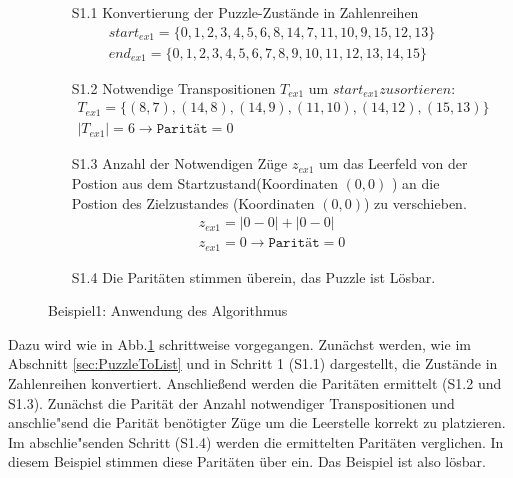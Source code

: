 \begin{figure}[H]
	\begin{enumerate}
		\item[S1.1] Konvertierung der Puzzle-Zustände in Zahlenreihen
		\begin{align*}
		start_{ex1} = \{0,1,2,3,4,5,6,8,14,7,11,10,9,15,12,13\} \\
		end_{ex1} = \{0,1,2,3,4,5,6,7,8,9,10,11,12,13,14,15\}
		\end{align*}
		\item[S1.2] Notwendige Transpositionen $T_{ex1}$ um $start_{ex1} zu sortieren:$
		\begin{align*}		
		T_{ex1} = \{(8,7),(14,8),(14,9),(11,10),(14,12),(15,13)\}\\
		\left\vert T_{ex1}\right\vert = 6 \rightarrow \texttt{Parität} = 0	
		\end{align*}
		\item[S1.3] Anzahl der Notwendigen Züge $z_{ex1}$ um das Leerfeld von der Postion aus dem Startzustand(Koordinaten $(0,0)$ ) an die Postion des Zielzustandes (Koordinaten $(0,0)$) zu verschieben.
		\begin{align*}		
		z_{ex1} = \left | 0 - 0 \right | + \left | 0 - 0 \right |\\
		z_{ex1} = 0 \rightarrow \texttt{Parität} = 0
		\end{align*}	
		\item[S1.4] Die Paritäten stimmen überein, das Puzzle ist Lösbar.	
	\end{enumerate}
	\caption{Beispiel1: Anwendung des Algorithmus \label{fig:Ex1_algo}}
\end{figure}
Dazu wird wie in Abb.\ref{fig:Ex1_algo} schrittweise vorgegangen. Zunächst werden, wie im Abschnitt \ref{sec:PuzzleToList} und in Schritt 1 (S1.1) dargestellt, die Zustände in Zahlenreihen konvertiert.
Anschließend werden die Paritäten ermittelt (S1.2 und S1.3). Zunächst die Parität der Anzahl notwendiger Transpositionen und anschlie"send die Parität benötigter Züge um die Leerstelle korrekt zu platzieren. Im abschlie"senden Schritt (S1.4) werden die ermittelten Paritäten verglichen. In diesem Beispiel stimmen diese Paritäten über ein. Das Beispiel ist also lösbar.\WNL%



